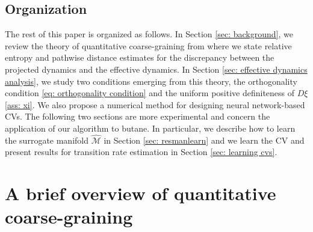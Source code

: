 \documentclass[reqno, 12pt]{article}
\begin{document}
\subsection{Organization} The rest of this paper is organized as follows. In Section \eqref{sec: background}, we review the theory of quantitative coarse-graining from \cite{legoll2010effective, duong2018quantification, lelievre2019pathwise} where we state relative entropy and pathwise distance estimates for the discrepancy between the projected dynamics and the effective dynamics. In Section \eqref{sec: effective dynamics analysis}, we study two conditions emerging from this theory, the orthogonality condition \eqref{eq: orthogonality condition} and the uniform positive definiteness of $D\xi$ \eqref{ass: xi}. We also propose a numerical method for designing neural network-based CVs. The following two sections are more experimental and concern the application of our algorithm to butane. In particular, we describe how to learn the surrogate manifold $\mathcal{\widehat{M}}$ in Section \ref{sec: resmanlearn} and we learn the CV and present results for transition rate estimation in Section \ref{sec: learning cvs}. 

\section{A brief overview of quantitative coarse-graining}
\label{sec: background}
\end{document}
